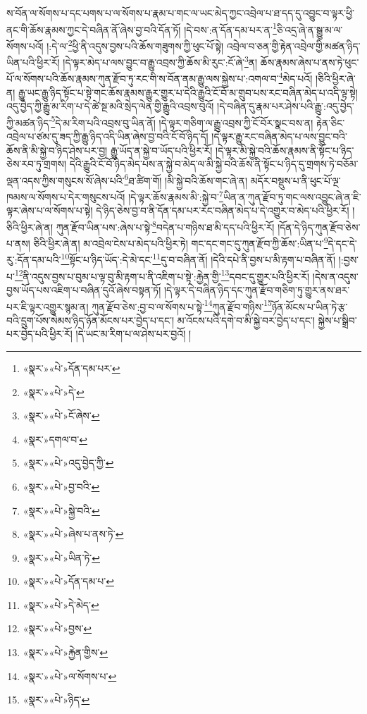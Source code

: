 ས་བོན་ལ་སོགས་པ་དང་པགས་པ་ལ་སོགས་པ་རྣམ་པ་གང་ལ་ཡང་མེད་ཀྱང་འབྲེལ་པ་ཐ་དད་དུ་འབྱུང་བ་ལྟར་ཕྱི་ནང་གི་ཆོས་རྣམས་ཀྱང་དེ་བཞིན་ནོ་ཞེས་བྱ་བའི་དོན་ཏོ། །དེ་བས་:ན་དོན་དམ་པར་ན་\footnote{«སྣར་»«པེ་»དོན་དམ་པར་}ཅི་འདྲ་ཞེ་ན་སྒྱུ་མ་ལ་སོགས་པའོ། །:དེ་ལ་\footnote{«སྣར་»«པེ་»དེ་}ཕྱི་ནི་འདུས་བྱས་པའི་ཆོས་གཟུགས་ཀྱི་ཕུང་པོ་སྟེ། འབྲེལ་བ་ཅན་གྱི་རྟེན་འབྲེལ་གྱི་མཚན་ཉིད་ཡིན་པའི་ཕྱིར་རོ། །དེ་ལྟར་མེད་པ་ལས་བྱུང་བ་རྒྱུ་འབྲས་ཀྱི་ཆོས་མི་རུང་:ངོ་ཞེ་\footnote{«སྣར་»«པེ་»ངོ་ཞེས་}ན། ཆོས་རྣམས་ཞེས་པ་ནས་ཏེ་ཕུང་པོ་ལ་སོགས་པའི་ཆོས་རྣམས་ཀུན་རྫོབ་ཏུ་རང་གི་ས་བོན་ནམ་རྒྱུ་ལས་སྐྱེས་པ་:འགལ་བ་\footnote{«སྣར་»དགལ་བ་}མེད་པའོ། །ཅིའི་ཕྱིར་ཞེ་ན། རྒྱུ་ཡང་རྒྱུ་ཉིད་སྟོང་པ་སྟེ་གང་ཆོས་རྣམས་རྒྱུར་གྱུར་པ་དེའི་རྒྱུའི་ངོ་བོ་མ་གྲུབ་པས་རང་བཞིན་མེད་པ་འདི་ལྟ་སྟེ། འདུ་བྱེད་ཀྱི་རྒྱུ་མ་རིག་པ་དེ་ཚེ་སྔ་མའི་སྲེད་ལེན་གྱི་རྒྱུའི་འབྲས་བུའོ། །དེ་བཞིན་དུ་རྣམ་པར་ཤེས་པའི་རྒྱུ་:འདུ་བྱེད་ཀྱི་མཚན་ཉིད་\footnote{«སྣར་»«པེ་»འདུ་བྱེད་ཀྱི་}དེ་མ་རིག་པའི་འབྲས་བུ་ཡིན་ནོ། །དེ་ལྟར་གཅིག་ལ་རྒྱུ་འབྲས་ཀྱི་ངོ་བོར་སྣང་བས་ན། རྟེན་ཅིང་འབྲེལ་པ་ཙམ་དུ་ཟད་ཀྱི་རྒྱུ་ཉིད་འདི་ཡིན་ཞེས་བྱ་བའི་ངོ་བོ་ཉིད་དོ། །དེ་ལྟར་རྒྱུ་རང་བཞིན་མེད་པ་ལས་བྱུང་བའི་ཆོས་ནི་མི་སྐྱེ་བ་ཉིད་ཤེས་པར་བྱ། རྒྱུ་ཡོད་ན་སྐྱེ་བ་ཡོད་པའི་ཕྱིར་རོ། །དེ་ལྟར་མི་སྐྱེ་བའི་ཆོས་རྣམས་ནི་སྟོང་པ་ཉིད་ཅེས་རབ་ཏུ་གྲགས། དེའི་རྒྱུའི་ངོ་བོ་ཉིད་མེད་པས་ན་སྐྱེ་བ་མེད་ལ་མི་སྐྱེ་བའི་ཆོས་ནི་སྟོང་པ་ཉིད་དུ་གྲགས་ཏེ་བཅོམ་ལྡན་འདས་ཀྱིས་གསུངས་སོ་ཞེས་པའི་\footnote{«སྣར་»«པེ་»བྱ་བའི་}ཐ་ཚིག་གོ། །མི་སྐྱེ་བའི་ཆོས་གང་ཞེ་ན། མདོར་བསྡུས་པ་ནི་ཕུང་པོ་ལྔ་ཁམས་ལ་སོགས་པ་དེར་གསུངས་པའོ། །དེ་ལྟར་ཆོས་རྣམས་མི་:སྐྱེ་བ་\footnote{«སྣར་»«པེ་»སྐྱེ་བའི་}ཡིན་ན་ཀུན་རྫོབ་ཏུ་གང་ལས་འབྱུང་ཞེ་ན་ཇི་ལྟར་ཞེས་པ་ལ་སོགས་པ་སྟེ། དེ་ཉིད་ཅེས་བྱ་བ་ནི་དོན་དམ་པར་རང་བཞིན་མེད་པ་དེ་འགྱུར་བ་མེད་པའི་ཕྱིར་རོ། །ཅིའི་ཕྱིར་ཞེ་ན། ཀུན་རྫོབ་ཡིན་པས་:ཞེས་པ་སྟེ་\footnote{«སྣར་»«པེ་»ཞེས་པ་ནས་ཏེ་}བདེན་པ་གཉིས་ཐ་མི་དད་པའི་ཕྱིར་རོ། །དོན་དེ་ཉིད་ཀུན་རྫོབ་ཅེས་པ་ནས། ཅིའི་ཕྱིར་ཞེ་ན། མ་འབྲེལ་ངེས་པ་མེད་པའི་ཕྱིར་ཏེ། གང་དང་གང་དུ་ཀུན་རྫོབ་ཀྱི་ཆོས་:ཡིན་པ་\footnote{«སྣར་»«པེ་»ཡིན་ཏེ་}དེ་དང་དེ་རུ་:དོན་དམ་པའི་\footnote{«སྣར་»«པེ་»དོན་དམ་པ་}སྟོང་པ་ཉིད་ཡོད་:དེ་མེ་དང་\footnote{«སྣར་»«པེ་»དེ་མེད་}དུ་བ་བཞིན་ནོ། །དེའི་དཔེ་ནི་བྱས་པ་མི་རྟག་པ་བཞིན་ནོ། །:བྱས་པ་\footnote{«སྣར་»«པེ་»བྱས་}ནི་འདུས་བྱས་པ་བུམ་པ་ལྟ་བུ་མི་རྟག་པ་ནི་འཇིག་པ་སྟེ་:རྐྱེན་གྱི་\footnote{«སྣར་»«པེ་»རྐྱེན་གྱིས་}དབང་དུ་གྱུར་པའི་ཕྱིར་རོ། །དེས་ན་འདུས་བྱས་ཡོད་པས་འཇིག་པ་བཞིན་དུའོ་ཞེས་བསྟན་ཏོ། །དེ་ལྟར་དེ་བཞིན་ཉིད་དང་ཀུན་རྫོབ་གཅིག་ཏུ་གྱུར་ནས་ཐར་པར་ཇི་ལྟར་འགྱུར་སྙམ་ན། ཀུན་རྫོབ་ཅེས་:བྱ་བ་ལ་སོགས་པ་སྟེ་\footnote{«སྣར་»«པེ་»ལ་སོགས་པ་}ཀུན་རྫོབ་གཉིས་\footnote{«སྣར་»«པེ་»ཉིད་}ཉོན་མོངས་པ་ཡིན་ཏེ་རྩ་བའི་དྲུག་པོས་སེམས་ཉིད་ཉོན་མོངས་པར་བྱེད་པ་དང་། མ་འོངས་པའི་དགེ་བ་མི་སྐྱེ་བར་བྱེད་པ་དང་། སྐྱེས་པ་སྒྲིབ་པར་བྱེད་པའི་ཕྱིར་རོ། །དེ་ཡང་མ་རིག་པ་ལ་ཤེས་པར་བྱའོ། །
